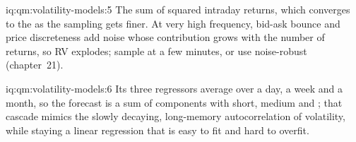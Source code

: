 \begin{solution}{iq:qm:volatility-models:5}
The sum of squared intraday returns, which converges to the  as the sampling gets finer. At very high frequency, bid-ask bounce and price
discreteness add noise whose contribution grows with the number of returns, so RV explodes; sample at a few minutes, or use noise-robust 
(chapter~21).
\end{solution}

\begin{solution}{iq:qm:volatility-models:6}
Its three regressors average  over a day, a week and a month, so the forecast is a sum of components with short, medium and ; that
cascade mimics the slowly decaying, long-memory autocorrelation of volatility, while staying a linear regression that is easy to fit and hard to overfit.
\end{solution}
